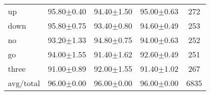 \documentclass{beamer}
\begin{document}
{\begin{table}
\begin{tabular}{lcccc}
		up        &  95.80$\pm$0.40 &  94.40$\pm$1.50 &  95.00$\pm$0.63 &     272 \\
		down      &  95.80$\pm$0.75 &  93.40$\pm$0.80 &  94.60$\pm$0.49 &     253 \\
		no        &  93.20$\pm$1.33 &  94.80$\pm$0.75 &  94.00$\pm$0.63 &     252 \\
		go        &  94.00$\pm$1.55 &  91.40$\pm$1.62 &  92.60$\pm$0.49 &     251 \\
		three     &  91.00$\pm$0.89 &  92.00$\pm$1.55 &  91.40$\pm$1.02 &     267 \\
		\midrule avg/total &  96.00$\pm$0.00 &  96.00$\pm$0.00 &  96.00$\pm$0.00 &    6835 \\
		\bottomrule
	\end{tabular}

\end{table}

}

\end{document}

